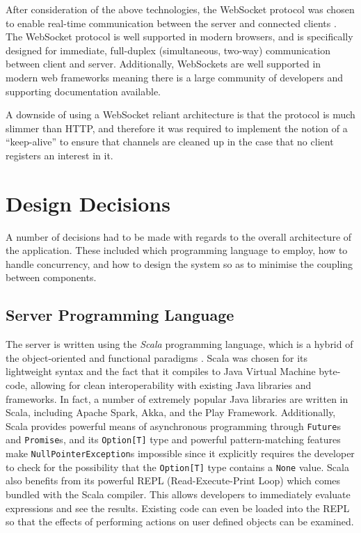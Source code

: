 \documentclass{l4proj}
\newcommand{\code}[1]{\texttt{#1}}
\begin{document}
       After consideration of the above technologies, the WebSocket protocol was chosen to enable real-time communication between the server and connected clients \cite{websocket}. The WebSocket protocol is well supported in modern browsers, and is specifically designed for immediate, full-duplex (simultaneous, two-way) communication between client and server. Additionally, WebSockets are well supported in modern web frameworks meaning there is a large community of developers  and supporting documentation available.
          
        A downside of using a WebSocket reliant architecture is that the protocol is much slimmer than HTTP, and therefore it was required to implement the notion of a ``keep-alive'' to ensure that channels are cleaned up in the case that no client registers an interest in it.


    \section{Design Decisions}

    A number of decisions had to be made with regards to the overall architecture of the application. These included which programming language to employ, how to handle concurrency, and how to design the system so as to minimise the coupling between components.

    \subsection{Server Programming Language}
            The server is written using the \textit{Scala} programming language, which is a hybrid of the object-oriented and functional paradigms \cite{scala}. Scala was chosen for its lightweight syntax and the fact that it compiles to Java Virtual Machine byte-code, allowing for clean interoperability with existing Java libraries and frameworks. In fact, a number of extremely popular Java libraries are written in Scala, including Apache Spark, Akka, and the Play Framework. Additionally, Scala provides powerful means of asynchronous programming through \code{Future}s and \code{Promise}s, and its \code{Option[T]} type and powerful pattern-matching features make \code{NullPointerException}s impossible since it explicitly requires the developer to check for the possibility that the \code{Option[T]} type contains a \code{None} value. Scala also benefits from its powerful REPL (Read-Execute-Print Loop) which comes bundled with the Scala compiler. This allows developers to immediately evaluate expressions and see the results. Existing code can even be loaded into the REPL so that the effects of performing actions on user defined objects can be examined.
            
\end{document}
